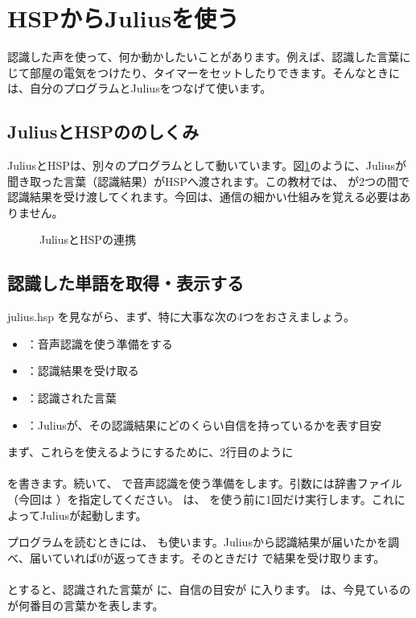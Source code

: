 \documentclass[text06.tex]{subfiles}
\begin{document}
\newpage
\section{HSPからJuliusを使う}
認識した声を使って、何か動かしたいことがあります。例えば、認識した言葉にじて部屋の電気をつけたり、タイマーをセットしたりできます。そんなときには、自分のプログラムとJuliusをつなげて使います。
\subsection{JuliusとHSPののしくみ}
JuliusとHSPは、別々のプログラムとして動いています。図\ref{JuliusとHSPの連携}のように、Juliusが聞き取った言葉（認識結果）がHSPへ渡されます。この教材では、 が2つの間で認識結果を受け渡してくれます。今回は、通信の細かい仕組みを覚える必要はありません。
\begin{figure}[H]
\begin{center}
    
    \caption{JuliusとHSPの連携}
    \label{JuliusとHSPの連携}
\end{center}
\end{figure}

\subsection{認識した単語を取得・表示する}
\mbox{julius.hsp} を見ながら、まず、特に大事な次の4つをおさえましょう。

\begin{itemize}
\item {}：音声認識を使う準備をする
\item {}：認識結果を受け取る
\item {}：認識された言葉
\item {}：Juliusが、その認識結果にどのくらい自信を持っているかを表す目安
\end{itemize}

まず、これらを使えるようにするために、2行目のように\\
\\
を書きます。続いて、 で音声認識を使う準備をします。引数には辞書ファイル（今回は \mbox{}）を指定してください。 は、 を使う前に1回だけ実行します。これによってJuliusが起動します。

プログラムを読むときには、 も使います。Juliusから認識結果が届いたかを調べ、届いていれば0が返ってきます。そのときだけ  で結果を受け取ります。\\
\\
とすると、認識された言葉が  に、自信の目安が  に入ります。 は、今見ているのが何番目の言葉かを表します。
\end{document}
